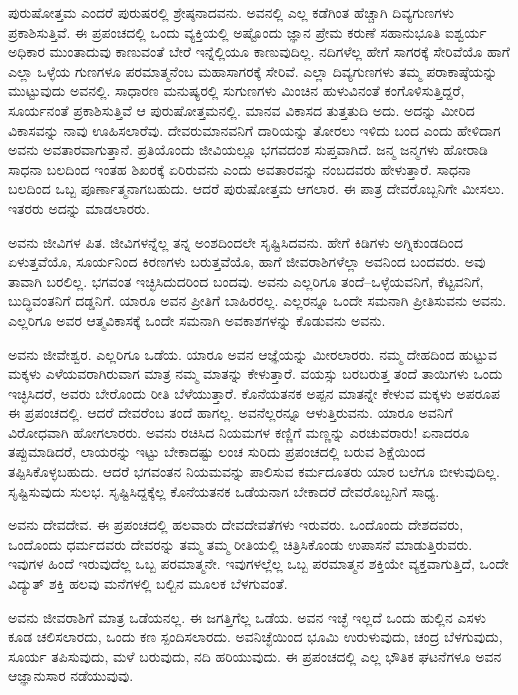 ಪುರುಷೋತ್ತಮ ಎಂದರೆ ಪುರುಷರಲ್ಲಿ ಶ್ರೇಷ್ಠನಾದವನು. ಅವನಲ್ಲಿ ಎಲ್ಲ ಕಡೆಗಿಂತ ಹೆಚ್ಚಾಗಿ ದಿವ್ಯಗುಣಗಳು ಪ್ರಕಾಶಿಸುತ್ತಿವೆ. ಈ ಪ್ರಪಂಚದಲ್ಲಿ ಒಂದು ವ್ಯಕ್ತಿಯಲ್ಲಿ ಅಷ್ಟೊಂದು ಜ್ಞಾನ ಪ್ರೇಮ ಕರುಣೆ ಸಹಾನುಭೂತಿ ಐಶ್ವರ್ಯ ಅಧಿಕಾರ ಮುಂತಾದುವು ಕಾಣುವಂತೆ ಬೇರೆ ಇನ್ನೆಲ್ಲಿಯೂ ಕಾಣುವುದಿಲ್ಲ. ನದಿಗಳೆಲ್ಲ ಹೇಗೆ ಸಾಗರಕ್ಕೆ ಸೇರಿವೆಯೊ ಹಾಗೆ ಎಲ್ಲಾ ಒಳ್ಳೆಯ ಗುಣಗಳೂ ಪರಮಾತ್ಮನೆಂಬ ಮಹಾಸಾಗರಕ್ಕೆ ಸೇರಿವೆ. ಎಲ್ಲಾ ದಿವ್ಯಗುಣಗಳು ತಮ್ಮ ಪರಾಕಾಷ್ಠೆಯನ್ನು ಮುಟ್ಟುವುದು ಅವನಲ್ಲಿ. ಸಾಧಾರಣ ಮನುಷ್ಯರಲ್ಲಿ ಸುಗುಣಗಳು ಮಿಂಚಿನ ಹುಳುವಿನಂತೆ ಕಂಗೊಳಿಸುತ್ತಿದ್ದರೆ, ಸೂರ್ಯನಂತೆ ಪ್ರಕಾಶಿಸುತ್ತಿವೆ ಆ ಪುರುಷೋತ್ತಮನಲ್ಲಿ. ಮಾನವ ವಿಕಾಸದ ತುತ್ತತುದಿ ಅದು. ಅದನ್ನು ಮೀರಿದ ವಿಕಾಸವನ್ನು ನಾವು ಊಹಿಸಲಾರೆವು. ದೇವರು\break ಮಾನವನಿಗೆ ದಾರಿಯನ್ನು ತೋರಲು ಇಳಿದು ಬಂದ ಎಂದು ಹೇಳಿದಾಗ ಅವನು ಅವತಾರವಾಗುತ್ತಾನೆ. ಪ್ರತಿಯೊಂದು ಜೀವಿಯಲ್ಲೂ ಭಗವದಂಶ ಸುಪ್ತವಾಗಿದೆ. ಜನ್ಮ ಜನ್ಮಗಳು ಹೋರಾಡಿ ಸಾಧನಾ ಬಲದಿಂದ ಇಂತಹ ಶಿಖರಕ್ಕೆ ಏರಿರುವನು ಎಂದು ಅವತಾರವನ್ನು ನಂಬದವರು ಹೇಳುತ್ತಾರೆ. ಸಾಧನಾ ಬಲದಿಂದ ಒಬ್ಬ ಪೂರ್ಣಾತ್ಮನಾಗಬಹುದು. ಆದರೆ ಪುರುಷೋತ್ತಮ ಆಗಲಾರ. ಈ ಪಾತ್ರ ದೇವರೊಬ್ಬನಿಗೇ ಮೀಸಲು. ಇತರರು ಅದನ್ನು ಮಾಡಲಾರರು.

ಅವನು ಜೀವಿಗಳ ಪಿತ. ಜೀವಿಗಳನ್ನೆಲ್ಲ ತನ್ನ ಅಂಶದಿಂದಲೇ ಸೃಷ್ಟಿಸಿದವನು. ಹೇಗೆ ಕಿಡಿಗಳು ಅಗ್ನಿಕುಂಡದಿಂದ ಏಳುತ್ತವೆಯೊ, ಸೂರ್ಯನಿಂದ ಕಿರಣಗಳು ಬರುತ್ತವೆಯೊ, ಹಾಗೆ ಜೀವರಾಶಿಗಳೆಲ್ಲಾ ಅವನಿಂದ ಬಂದವರು. ಅವು ತಾವಾಗಿ ಬರಲಿಲ್ಲ. ಭಗವಂತ ಇಚ್ಛಿಸಿದುದರಿಂದ ಬಂದವು. ಅವನು ಎಲ್ಲರಿಗೂ ತಂದೆ–ಒಳ್ಳೆಯವನಿಗೆ, ಕೆಟ್ಟವನಿಗೆ, ಬುದ್ಧಿವಂತನಿಗೆ ದಡ್ಡನಿಗೆ. ಯಾರೂ ಅವನ ಪ್ರೀತಿಗೆ ಬಾಹಿರರಲ್ಲ. ಎಲ್ಲರನ್ನೂ ಒಂದೇ ಸಮನಾಗಿ ಪ್ರೀತಿಸುವನು ಅವನು. ಎಲ್ಲರಿಗೂ ಅವರ ಆತ್ಮವಿಕಾಸಕ್ಕೆ ಒಂದೇ ಸಮನಾಗಿ ಅವಕಾಶಗಳನ್ನು ಕೊಡುವನು ಅವನು.

ಅವನು ಜೀವೇಶ್ವರ. ಎಲ್ಲರಿಗೂ ಒಡೆಯ. ಯಾರೂ ಅವನ ಆಜ್ಞೆಯನ್ನು ಮೀರಲಾರರು. ನಮ್ಮ ದೇಹದಿಂದ ಹುಟ್ಟುವ ಮಕ್ಕಳು ಎಳೆಯವರಾಗಿರುವಾಗ ಮಾತ್ರ ನಮ್ಮ ಮಾತನ್ನು ಕೇಳುತ್ತಾರೆ. ವಯಸ್ಸು ಬರಬರುತ್ತ ತಂದೆ ತಾಯಿಗಳು ಒಂದು ಇಚ್ಛಿಸಿದರೆ, ಅವರು ಬೇರೊಂದು ರೀತಿ ಬೆಳೆಯುತ್ತಾರೆ. ಕೊನೆಯತನಕ ಅಪ್ಪನ ಮಾತನ್ನೇ ಕೇಳುವ ಮಕ್ಕಳು ಅಪರೂಪ ಈ ಪ್ರಪಂಚದಲ್ಲಿ. ಆದರೆ ದೇವರೆಂಬ ತಂದೆ ಹಾಗಲ್ಲ. ಅವನೆಲ್ಲರನ್ನೂ ಆಳುತ್ತಿರುವನು. ಯಾರೂ ಅವನಿಗೆ ವಿರೋಧವಾಗಿ ಹೋಗಲಾರರು. ಅವನು ರಚಿಸಿದ ನಿಯಮಗಳ ಕಣ್ಣಿಗೆ ಮಣ್ಣನ್ನು ಎರಚುವರಾರು! ಏನಾದರೂ ತಪ್ಪುಮಾಡಿದರೆ, ಲಾಯರನ್ನು ಇಟ್ಟು ಬೇಕಾದಷ್ಟು ಲಂಚ ಸುರಿದು ಪ್ರಪಂಚದಲ್ಲಿ ಬರುವ ಶಿಕ್ಷೆಯಿಂದ ತಪ್ಪಿಸಿಕೊಳ್ಳಬಹುದು. ಆದರೆ ಭಗವಂತನ ನಿಯಮವನ್ನು ಪಾಲಿಸುವ ಕರ್ಮದೂತರು ಯಾರ ಬಲೆಗೂ ಬೀಳುವುದಿಲ್ಲ. ಸೃಷ್ಟಿಸುವುದು ಸುಲಭ. ಸೃಷ್ಟಿಸಿದ್ದಕ್ಕೆಲ್ಲ ಕೊನೆಯತನಕ ಒಡೆಯನಾಗ ಬೇಕಾದರೆ ದೇವರೊಬ್ಬನಿಗೆ ಸಾಧ್ಯ.

ಅವನು ದೇವದೇವ. ಈ ಪ್ರಪಂಚದಲ್ಲಿ ಹಲವಾರು ದೇವದೇವತೆಗಳು ಇರುವರು. ಒಂದೊಂದು ದೇಶದವರು, ಒಂದೊಂದು ಧರ್ಮದವರು ದೇವರನ್ನು ತಮ್ಮ ತಮ್ಮ ರೀತಿಯಲ್ಲಿ ಚಿತ್ರಿಸಿಕೊಂಡು ಉಪಾಸನೆ ಮಾಡುತ್ತಿರುವರು. ಇವುಗಳ ಹಿಂದೆ ಇರುವುದೆಲ್ಲ ಒಬ್ಬ ಪರಮಾತ್ಮನೇ. ಇವುಗಳಲ್ಲೆಲ್ಲ ಒಬ್ಬ ಪರಮಾತ್ಮನ ಶಕ್ತಿಯೇ ವ್ಯಕ್ತವಾಗುತ್ತಿದೆ, ಒಂದೇ ವಿದ್ಯುತ್ ಶಕ್ತಿ ಹಲವು ಮನೆಗಳಲ್ಲಿ ಬಲ್ಬಿನ ಮೂಲಕ ಬೆಳಗುವಂತೆ.

ಅವನು ಜೀವರಾಶಿಗೆ ಮಾತ್ರ ಒಡೆಯನಲ್ಲ. ಈ ಜಗತ್ತಿಗೆಲ್ಲ ಒಡೆಯ. ಅವನ ಇಚ್ಛೆ ಇಲ್ಲದೆ ಒಂದು ಹುಲ್ಲಿನ ಎಸಳು ಕೂಡ ಚಲಿಸಲಾರದು, ಒಂದು ಕಣ ಸ್ಪಂದಿಸಲಾರದು. ಅವನಿಚ್ಛೆಯಿಂದ ಭೂಮಿ ಉರುಳುವುದು, ಚಂದ್ರ ಬೆಳಗುವುದು, ಸೂರ್ಯ ತಪಿಸುವುದು, ಮಳೆ ಬರುವುದು, ನದಿ ಹರಿಯುವುದು. ಈ ಪ್ರಪಂಚದಲ್ಲಿ ಎಲ್ಲ ಭೌತಿಕ ಘಟನೆಗಳೂ ಅವನ ಆಜ್ಞಾನುಸಾರ ನಡೆಯುವುವು.

